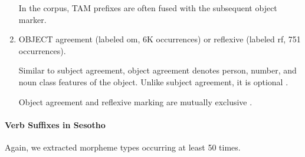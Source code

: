 \documentclass[11pt,letterpaper]{article}
\begin{document}
\begin{enumerate}
\begin{itemize}
    
    \end{itemize}
    
    
    
    In the corpus, TAM prefixes are often fused with the subsequent object marker.
    
    
    
    \item OBJECT agreement (labeled om, 6K occurrences) or reflexive (labeled rf, 751 occurrences).
    
    Similar to subject agreement, object agreement denotes person, number, and noun class features of the object.
    Unlike subject agreement, it is optional \cite[]{doke1967textbook}.
    
    Object agreement and reflexive marking are mutually exclusive \cite[p. 165]{guma1971outline}.
\end{enumerate}









\paragraph{Verb Suffixes in Sesotho}

Again, we extracted morpheme types occurring at least 50 times.
\end{document}
